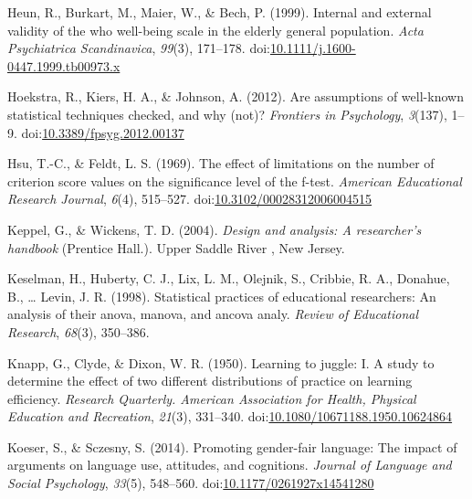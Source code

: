 \documentclass[man,floatsintext]{apa6}
\begin{document}
\leavevmode\hypertarget{ref-Heun_et_al_1999}{}%
Heun, R., Burkart, M., Maier, W., \& Bech, P. (1999). Internal and external validity of the who well-being scale in the elderly general population. \emph{Acta Psychiatrica Scandinavica}, \emph{99}(3), 171--178. doi:\href{https://doi.org/10.1111/j.1600-0447.1999.tb00973.x\%20}{10.1111/j.1600-0447.1999.tb00973.x }

\leavevmode\hypertarget{ref-Hoekstra_et_al_2012}{}%
Hoekstra, R., Kiers, H. A., \& Johnson, A. (2012). Are assumptions of well-known statistical techniques checked, and why (not)? \emph{Frontiers in Psychology}, \emph{3}(137), 1--9. doi:\href{https://doi.org/10.3389/fpsyg.2012.00137}{10.3389/fpsyg.2012.00137}

\leavevmode\hypertarget{ref-Hsu_and_Feldt_1969}{}%
Hsu, T.-C., \& Feldt, L. S. (1969). The effect of limitations on the number of criterion score values on the significance level of the f-test. \emph{American Educational Research Journal}, \emph{6}(4), 515--527. doi:\href{https://doi.org/10.3102/00028312006004515}{10.3102/00028312006004515}

\leavevmode\hypertarget{ref-Keppel_and_Wickens_2004}{}%
Keppel, G., \& Wickens, T. D. (2004). \emph{Design and analysis: A researcher's handbook} (Prentice Hall.). Upper Saddle River , New Jersey.

\leavevmode\hypertarget{ref-Keselman_et_al_1998}{}%
Keselman, H., Huberty, C. J., Lix, L. M., Olejnik, S., Cribbie, R. A., Donahue, B., \ldots{} Levin, J. R. (1998). Statistical practices of educational researchers: An analysis of their anova, manova, and ancova analy. \emph{Review of Educational Research}, \emph{68}(3), 350--386.

\leavevmode\hypertarget{ref-Knapp_and_Dixon_1950}{}%
Knapp, G., Clyde, \& Dixon, W. R. (1950). Learning to juggle: I. A study to determine the effect of two different distributions of practice on learning efficiency. \emph{Research Quarterly. American Association for Health, Physical Education and Recreation}, \emph{21}(3), 331--340. doi:\href{https://doi.org/10.1080/10671188.1950.10624864}{10.1080/10671188.1950.10624864}

\leavevmode\hypertarget{ref-Koeser_and_Sczesny_2014}{}%
Koeser, S., \& Sczesny, S. (2014). Promoting gender-fair language: The impact of arguments on language use, attitudes, and cognitions. \emph{Journal of Language and Social Psychology}, \emph{33}(5), 548--560. doi:\href{https://doi.org/10.1177/0261927x14541280}{10.1177/0261927x14541280}
\end{document}
